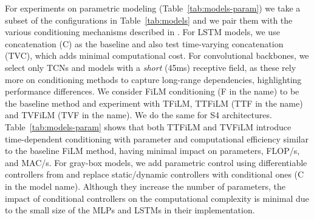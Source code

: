 For experiments on parametric modeling (Table~\ref{tab:models-param}) we take a subset of the configurations in Table~\ref{tab:models} and we pair them with the various conditioning mechanisms described in \citep{comunità2025nablafxframeworkdifferentiableblackbox}.
For LSTM models, we use concatenation (C) as the baseline and also test time-varying concatenation (TVC), which adds minimal computational cost.
For convolutional backbones, we select only TCNs and models with a \textit{short} (45ms) receptive field, as these rely more on conditioning methods to capture long-range dependencies, highlighting performance differences.
We consider FiLM conditioning (F in the name) to be the baseline method and experiment with TFiLM, TTFiLM (TTF in the name) and TVFiLM (TVF in the name). 
We do the same for S4 architectures.
Table~\ref{tab:models-param} shows that both TTFiLM and TVFiLM introduce time-dependent conditioning with parameter and computational efficiency similar to the baseline FiLM method, having minimal impact on parameters, FLOP/s, and MAC/s.
For gray-box models, we add parametric control using differentiable controllers from \citep{comunità2025nablafxframeworkdifferentiableblackbox} and replace static/dynamic controllers with conditional ones (C in the model name).
Although they increase the number of parameters, the impact of conditional controllers on the computational complexity is minimal due to the small size of the MLPs and LSTMs in their implementation.

